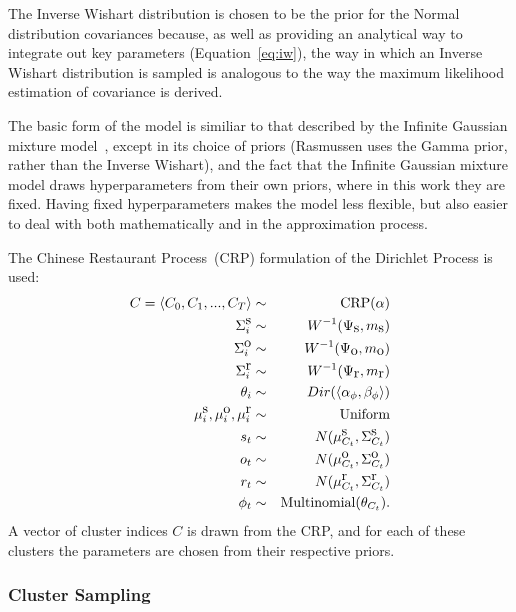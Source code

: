 The Inverse Wishart distribution is chosen to be the prior for the Normal distribution covariances because, as well as providing an analytical way to integrate out key parameters (Equation~\ref{eq:iw}), the way in which an Inverse Wishart distribution is sampled is analogous to the way the maximum likelihood estimation of covariance is derived.

The basic form of the model is similiar to that described by the Infinite Gaussian mixture model~\cite{rasmussen00}, except in its choice of priors (Rasmussen uses the Gamma prior, rather than the Inverse Wishart), and the fact that the Infinite Gaussian mixture model draws hyperparameters from their own priors, where in this work they are fixed. Having fixed hyperparameters makes the model less flexible, but also easier to deal with both mathematically and in the approximation process.

The Chinese Restaurant Process~(CRP) formulation of the Dirichlet Process is used:
\begin{eqnarray*}
C=\left<C_0,C_1,...,C_T\right> &\sim& \mbox{CRP}(\alpha)\\
\Sigma^{\mbox s}_i &\sim& W^{-1}(\Psi_{\mbox s}, m_{\mbox s})\\
\Sigma^{\mbox o}_i &\sim& W^{-1}(\Psi_{\mbox o}, m_{\mbox o})\\
\Sigma^{\mbox r}_i &\sim& W^{-1}(\Psi_{\mbox r}, m_{\mbox r})\\
\theta_i &\sim& Dir(\left<\alpha_\phi, \beta_\phi\right>)\\
\mu^{\mbox s}_i,\mu^{\mbox o}_i,\mu^{\mbox r}_i &\sim& \mbox{Uniform}\\
s_t &\sim& N(\mu^{\mbox s}_{C_t},\Sigma^{\mbox s}_{C_t})\\
o_t &\sim& N(\mu^{\mbox o}_{C_t},\Sigma^{\mbox o}_{C_t})\\
r_t &\sim& N(\mu^{\mbox r}_{C_t},\Sigma^{\mbox r}_{C_t})\\
\phi_t &\sim& \mbox{Multinomial}(\theta_{C_t}).
\end{eqnarray*}
A vector of cluster indices $C$ is drawn from the CRP, and for each of these clusters the parameters are chosen from their respective priors.


\subsubsection{Cluster Sampling}

